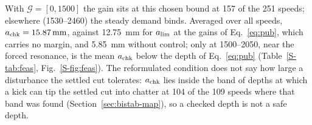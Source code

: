 With $\mathcal G=[0,1500]$ the gain sits at this chosen bound at 157 of the 251 speeds; elsewhere (1530--\SI{2460}{\rpm}) the steady demand binds. Averaged over all speeds, $a_{\mathrm{chk}}=\SI{15.87}{\milli\metre}$, against \SI{12.75}{\milli\metre} for $a_{\lim}$ at the gains of Eq.~\eqref{eq:pub}, which carries no margin, and \SI{5.85}{\milli\metre} without control; only at 1500--\SI{2050}{\rpm}, near the forced resonance, is the mean $a_{\mathrm{chk}}$ below the depth of Eq.~\eqref{eq:pub} (Table~\ref{S-tab:feas}, Fig.~\ref{S-fig:feas}). The reformulated condition does not say how large a disturbance the settled cut tolerates: $a_{\mathrm{chk}}$ lies inside the band of depths at which a kick can tip the settled cut into chatter at 104 of the 109 speeds where that band was found (Section~\ref{sec:bistab-map}), so a checked depth is not a safe depth.
